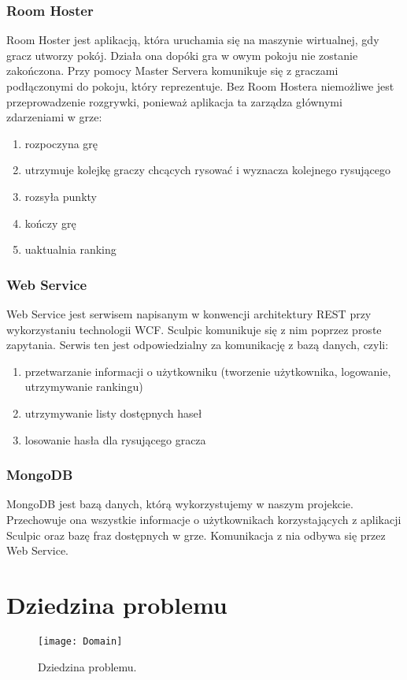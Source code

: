 \subsubsection{Room Hoster}
Room Hoster jest aplikacją, która uruchamia się na maszynie wirtualnej, gdy gracz utworzy pokój. Działa ona dopóki gra w owym pokoju nie zostanie zakończona. Przy pomocy Master Servera komunikuje się z graczami podłączonymi do pokoju, który reprezentuje. Bez Room Hostera niemożliwe jest przeprowadzenie rozgrywki, ponieważ aplikacja ta zarządza głównymi zdarzeniami w grze:
\begin{enumerate}
    \item rozpoczyna grę
    \item utrzymuje kolejkę graczy chcących rysować i wyznacza kolejnego rysującego
    \item rozsyła punkty
    \item kończy grę
    \item uaktualnia ranking
\end{enumerate}

\subsubsection{Web Service}
Web Service jest serwisem napisanym w konwencji architektury REST przy wykorzystaniu technologii WCF. Sculpic komunikuje się z nim poprzez proste zapytania. Serwis ten jest odpowiedzialny za komunikację z bazą danych, czyli:
\begin{enumerate}
    \item przetwarzanie informacji o użytkowniku (tworzenie użytkownika, logowanie, utrzymywanie rankingu)
    \item utrzymywanie listy dostępnych haseł
    \item losowanie hasła dla rysującego gracza
\end{enumerate}

\subsubsection{MongoDB}
MongoDB jest bazą danych, którą wykorzystujemy w naszym projekcie. Przechowuje ona wszystkie informacje o użytkownikach korzystających z aplikacji Sculpic oraz bazę fraz dostępnych w grze. Komunikacja z nia odbywa się przez Web Service.

\section{Dziedzina problemu}
\begin{figure}[htbp]
\centering
\texttt{[image: Domain]}
\caption{Dziedzina problemu.}
\label{fig:domain}
\end{figure}

